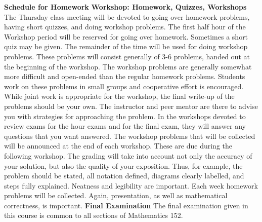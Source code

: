 \bigskip
{\bf Schedule for Homework}
\smallskip
{}
\bigskip
{\bf Workshop: Homework, Quizzes, Workshops} %
\smallskip
The Thursday class meeting will be devoted to going over homework problems,
having short quizzes, and doing workshop problems.
\smallskip
The first half hour of the Workshop period will be reserved 
for going over homework. Sometimes a short quiz may be given. The
remainder of the time will be used for doing workshop problems.
These problems will consist generally of 3-6 problems, handed out at
the beginning of the workshop.  The workshop problems are generally
somewhat more difficult and open-ended than the regular homework
problems. Students work on these problems in small groups and 
cooperative effort is encouraged. While joint work is appropriate
for the workshop, the final write-up of the problems should be your
own. The instructor and peer mentor are there to advise you 
with strategies for approaching the problem. In 
the workshops devoted to review exams for the hour exams and for the
final exam, they will answer any questions that you
want answered. %
\smallskip
The workshop problems that will be collected will be announced at
the end of each workshop.  These are due during the following
workshop.  The grading will take into account not only the accuracy
of your solution, but also the quality of your exposition. Thus, for
example, the problem should be stated, all notation defined, diagrams
clearly labelled, and steps fully explained. Neatness and legibility
are important.
\smallskip
Each week homework problems will be collected. 
Again, presentation, as well as mathematical
correctness, is important.
\bigskip
{\bf Final Examination} \hfil \break
The final examination given in this course is common to all sections
of Mathematics 152.

 \vfil \eject \bye







